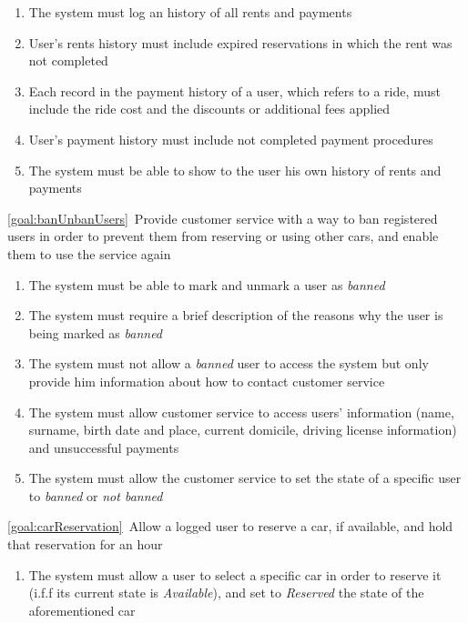 \begin{description}
  			\begin{enumerate}[resume*] 
  				\item The system must log an history of all rents and payments
  				\item User's rents history must include expired reservations in which the rent was not completed
  				\item Each record in the payment history of a user, which refers to a ride, must include the ride cost and 
  				the discounts or additional fees applied
  				\item User's payment history must include not completed payment procedures
  				\item The system must be able to show to the user his own history of rents and
  				payments
  			\end{enumerate}
  		\item \ref{goal:banUnbanUsers}\ Provide customer service with a way to ban registered users in order to prevent them from reserving or using other cars, and enable them to use the service again
  			\begin{enumerate}[resume*]
  				\item The system must be able to mark and unmark a user as \emph{banned} 
  				\item The system must require a brief description of the reasons why the user is being
  				marked as \emph{banned}
  				\item The system must not allow a \emph{banned} user to access the system but only
  				provide him information about how to contact customer service 
  				\item The system must allow customer service to access users' information (name,
  				surname, birth date and place, current domicile, driving license information) and
  				unsuccessful payments
   				\item The system must allow the customer service to set the state of a
   				specific user to \emph{banned} or \emph{not banned}
   			\end{enumerate}
 	  	\item \ref{goal:carReservation}\ Allow a logged user to reserve a car, if available, and hold that
 	  	reservation for an hour
 	  		\begin{enumerate}[resume*]
 	  			\item The system must allow a user to select a specific car in order to reserve it 
 	  			(i.f.f its current state is \emph{Available}), and set to \emph{Reserved} the state of
 	  			the aforementioned car

\end{enumerate}
\end{description}
